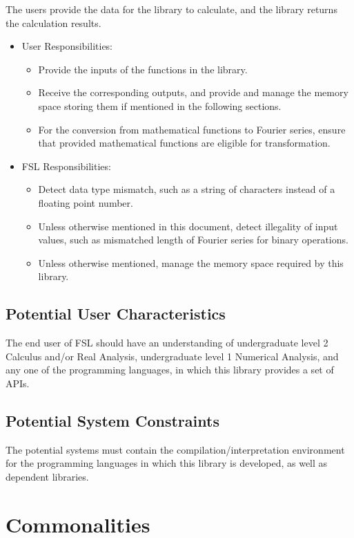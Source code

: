\documentclass[12pt]{article}
\newcommand{\famname}{FSL} %
\begin{document}
The users provide the data for the library to  calculate, and the library 
returns the calculation results.
\begin{itemize}
\item User Responsibilities:
\begin{itemize}
\item Provide the inputs of the functions in the library.
\item Receive the corresponding outputs, and provide and manage 
the memory space storing them if mentioned in the following sections.
\item For the conversion from mathematical functions to Fourier series, 
ensure that provided mathematical functions are eligible for transformation. 
\end{itemize}
\item \famname{} Responsibilities:
\begin{itemize}
\item Detect data type mismatch, such as a string of characters 
instead of a floating point number.
\item Unless otherwise mentioned in this document, detect illegality 
of input values, such as mismatched length of Fourier series 
for binary operations.
\item Unless otherwise mentioned, manage the memory space 
required by this library.
\end{itemize}
\end{itemize}

\subsection{Potential User Characteristics} \label{SecUserCharacteristics}

The end user of \famname{} should have an understanding of undergraduate 
level 2 Calculus and/or Real Analysis, undergraduate level 1 Numerical 
Analysis, and any one of the programming languages, in which this library 
provides a set of APIs.

\subsection{Potential System Constraints}
The potential systems must contain the compilation/interpretation environment 
for the programming languages in which this library is developed, as well 
as dependent libraries.

\section{Commonalities}\label{Sc:CA}
\end{document}
